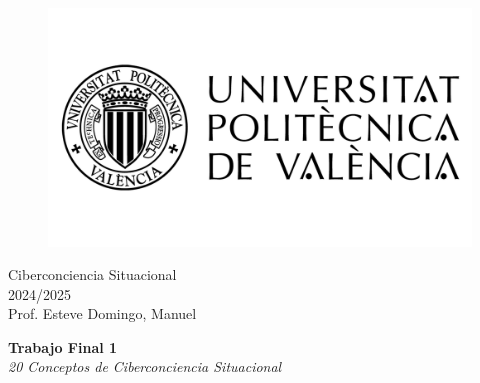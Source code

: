 \begin{titlepage}
   \begin{figure}
      \vspace{50mm}
       \centering
       \includegraphics[keepaspectratio=true,width=0.40\columnwidth]{images/upvLogo.png}
   \end{figure}
   
   \vspace{40mm}
   \begin{center}
       \LARGE{Ciberconciencia Situacional}
       \vspace{2.5mm}
       \\ \large{2024/2025}
       \vspace{5mm}
       \\ \large{Prof. Esteve Domingo, Manuel}
   \end{center}
   
   \begin{center}
      \vspace{10mm}
       {\LARGE{\textbf{Trabajo Final 1}\\ \vspace{5mm}
       \textit{20 Conceptos de Ciberconciencia Situacional}}}
       
   \end{center}
\end{titlepage}